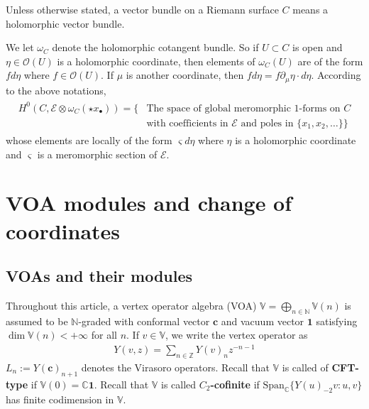 \documentclass[11pt,b5paper,notitlepage]{article}
\theoremstyle{definition}
\theoremstyle{plain}
\newcommand{\id}{\mathbf{1}}
\newcommand{\Span}{\mathrm{Span}}
\newcommand{\scr}{\mathscr}
\newcommand{\sgm}{\varsigma}
\newcommand{\blt}{\bullet}
\newcommand{\Vbb}{\mathbb V}
\newcommand{\Cbb}{\mathbb C}
\newcommand{\Nbb}{\mathbb N}
\newcommand{\Zbb}{\mathbb Z}
\newcommand{\cbf}{\mathbf c}
\numberwithin{equation}{section}
\begin{document}
Unless otherwise stated, a vector bundle on a Riemann surface $C$ means a holomorphic vector bundle.

We let $\omega_C$ denote the holomorphic cotangent bundle.  So if $U\subset C$ is open and $\eta\in\scr O(U)$ is a holomorphic coordinate, then elements of $\omega_C(U)$ are of the form $fd\eta$ where $f\in\scr O(U)$. If $\mu$ is another coordinate, then $fd\eta=f\partial_\mu\eta\cdot d\eta$. According to the above notations,
\begin{align}\label{eq11}
\begin{aligned}
H^0(C,\scr E\otimes\omega_C(\star x_\blt))=\{&\text{The space of global meromorphic $1$-forms on $C$}\\
&\text{with coefficients in $\scr E$ and poles in $\{x_1,x_2,\dots\}$}\}
\end{aligned}
\end{align}
whose elements are locally of the form $\sgm d\eta$ where $\eta$ is a holomorphic coordinate and $\sgm$ is a meromorphic section of $\scr E$.


\section{VOA modules and change of coordinates}\label{lb15}

 
\subsection{VOAs and their modules}

Throughout this article, a vertex operator algebra (VOA) $\Vbb=\bigoplus_{n\in\Nbb}\Vbb(n)$ is assumed to be $\Nbb$-graded  with conformal vector $\cbf$ and vacuum vector $\id$ satisfying $\dim\Vbb(n)<+\infty$ for all $n$. If $v\in\Vbb$, we write the vertex operator as 
\begin{align*}
Y(v,z)=\sum_{n\in\Zbb} Y(v)_n z^{-n-1}
\end{align*}
$L_n:=Y(\cbf)_{n+1}$ denotes the Virasoro operators. Recall that $\Vbb$ is called of \textbf{CFT-type} if $\Vbb(0)=\Cbb\id$. Recall that $\Vbb$ is called \textbf{$C_2$-cofinite} if $\Span_\Cbb\{Y(u)_{-2}v:u,v \}$ has finite codimension in $\Vbb$. 
\end{document}
